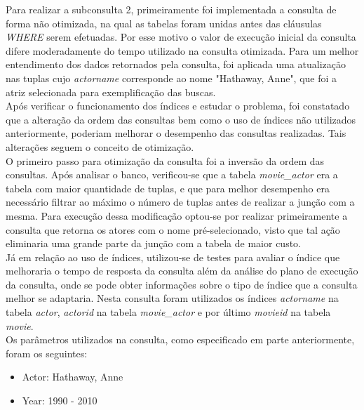 \documentclass[
	12pt,				%
	oneside,			%
	a4paper,			%
	brazil				%
	]{abntex2}
\begin{document}
\indent Para realizar a subconsulta 2, primeiramente foi implementada a consulta de forma não otimizada, na qual as tabelas foram unidas antes das cláusulas \textit{WHERE} serem efetuadas. Por esse motivo o valor de execução inicial da consulta difere moderadamente do tempo utilizado na consulta otimizada. Para um melhor entendimento dos dados retornados pela consulta, foi aplicada uma atualização nas tuplas cujo \textit{actorname} corresponde ao nome "Hathaway, Anne", que foi a atriz selecionada para exemplificação das buscas. 
\\\indent Após verificar o funcionamento dos índices e estudar o problema, foi constatado que a alteração da ordem das consultas bem como o uso de índices não utilizados anteriormente, poderiam melhorar o desempenho das consultas realizadas. Tais alterações seguem o conceito de otimização.
\\\indent O primeiro passo para otimização da consulta foi a inversão da ordem das consultas. Após analisar o banco, verificou-se que a tabela \textit{movie\_actor} era a tabela com maior quantidade de tuplas, e que para melhor desempenho era necessário filtrar ao máximo o número de tuplas antes de realizar a junção com a mesma. Para execução dessa modificação optou-se por realizar primeiramente a consulta que retorna os atores com o nome pré-selecionado, visto que tal ação eliminaria uma grande parte da junção com a tabela de maior custo.
\\\indent Já em relação ao uso de índices, utilizou-se de testes para avaliar o índice que melhoraria o tempo de resposta da consulta além da análise do plano de execução da consulta, onde se pode obter informações sobre o tipo de índice que a consulta melhor se adaptaria. Nesta consulta foram utilizados os índices \textit{actorname} na tabela \textit{actor}, \textit{actorid} na tabela \textit{movie\_actor} e por último \textit{movieid} na tabela \textit{movie}.
\\\indent Os parâmetros utilizados na consulta, como especificado em parte anteriormente, foram os seguintes:
\begin{itemize}
\item Actor: Hathaway, Anne
\item Year: 1990 - 2010
\end{itemize}\newpage

\newpage
\end{document}

